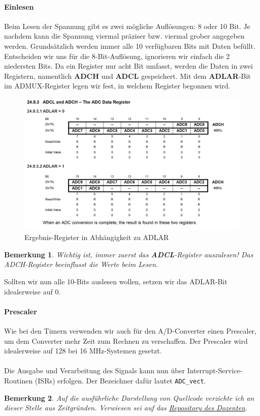 \documentclass[11pt,a4paper]{scrartcl}
\newtheorem{note}{Bemerkung}
\begin{document}
\paragraph{Einlesen} Beim Lesen der Spannung gibt es zwei mögliche Auflösungen: 8 oder 10 Bit. Je nachdem kann die Spannung viermal präziser bzw. viermal grober angegeben werden. Grundsätzlich werden immer alle 10 verfügbaren Bits mit Daten befüllt. Entscheiden wir uns für die 8-Bit-Auflösung, ignorieren wir einfach die 2 niedersten Bits. Da ein Register nur acht Bit umfasst, werden die Daten in zwei Registern, namentlich \textbf{ADCH} und \textbf{ADCL} gespeichert. Mit dem \textbf{ADLAR}-Bit im ADMUX-Register legen wir fest, in welchem Register begonnen wird.
\begin{figure}[h!]
\centering
\includegraphics[scale=0.7]{adcreg.PNG}
\caption{Ergebnis-Register in Abhängigkeit zu ADLAR}
\end{figure}
\begin{note}
Wichtig ist, immer zuerst das \textbf{ADCL}-Register auszulesen! Das ADCH-Register beeinflusst die Werte beim Lesen.
\end{note}
Sollten wir nun alle 10-Bits auslesen wollen, setzen wir das ADLAR-Bit idealerweise auf 0.
\paragraph{Prescaler} Wie bei den Timern verwenden wir auch für den A/D-Converter einen Prescaler, um dem Converter mehr Zeit zum Rechnen zu verschaffen. Der Prescaler wird idealerweise auf 128 bei 16 MHz-Systemen gesetzt. \\\\
Die Ausgabe und Verarbeitung des Signals kann nun über Interrupt-Service-Routinen (ISRs) erfolgen. Der Bezeichner dafür lautet \texttt{ADC{\_}vect}. \\
\begin{note}
Auf die ausführliche Darstellung von Quellcode verzichte ich an dieser Stelle aus Zeitgründen. Verwiesen sei auf das \href{https://github.com/LimagoHub/systemnahe-programmierung-dhbw-dezember-2021}{Repository des Dozenten}.
\end{note}
\pagebreak
\end{document}
